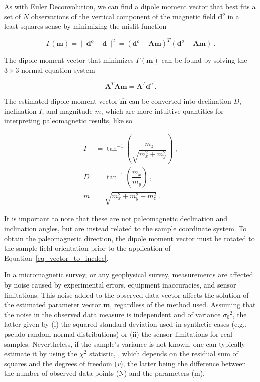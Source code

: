 As with Euler Deconvolution, we can find a dipole moment vector that best fits
a set of $N$ observations of the vertical component of the magnetic field
$\mathbf{d}^o$ in a least-squares sense by minimizing the misfit function

\begin{equation}
\label{uV9pRVYO4l}
\Gamma (\mathbf{m}) = \| \mathbf{d}^o - \mathbf{d} \|^2 = (\mathbf{d}^o - \mathbf{A}\mathbf{m})^T  (\mathbf{d}^o - \mathbf{A}\mathbf{m})\ .
\end{equation}

\noindent
The dipole moment vector that minimizes $\Gamma (\mathbf{m})$ can be found by
solving the $3 \times 3$ normal equation system

\begin{equation}
\mathbf{A}^T \mathbf{A} \mathbf{m} = \mathbf{A}^T\mathbf{d}^o\ .
\end{equation}

\noindent
The estimated dipole moment vector $\hat{\mathbf{m}}$ can be converted into declination $D$, inclination $I$, and magnitude $m$, which are more intuitive quantities for interpreting paleomagnetic results, like so

\begin{equation}
  \label{eq_vector_to_incdec}
\begin{aligned}
I &= \tan^{-1}\left(\dfrac{m_z}{\sqrt{m_x^2 + m_y^2}}\right) \ , \\
D &= \tan^{-1}\left(\dfrac{m_x}{m_y}\right) \ , \\
m &= \sqrt{m_x^2 + m_y^2 + m_z^2} \ .
\end{aligned}
\end{equation}

It is important to note that these are not paleomagnetic declination and inclination angles, but are instead related to the sample coordinate system. To obtain the paleomagnetic direction, the dipole moment vector must be rotated to the sample field orientation prior to the application of Equation~\ref{eq_vector_to_incdec}.

In a micromagnetic survey, or any geophysical survey, measurements are affected by noise caused by experimental errors, equipment inaccuracies, and sensor limitations. This noise added to the observed data vector affects the solution of the estimated parameter vector $\mathbf{m}$, regardless of the method used. Assuming that the noise in the observed data measure is independent and of variance ${\sigma_0}^2$, the latter given by (i) the squared standard deviation used in synthetic cases (e.g., pseudo-random normal distributions) or (ii) the sensor limitations for real samples. Nevertheless, if the sample's variance is not known, one can typically estimate it by using the \emph{$\chi^2$} statistic, \citep[Eq.~\ref{chi_square},][]{Aster2019}, which depends on the residual sum of squares and the degrees of freedom (\emph{v}), the latter being the difference between the number of observed data points (N) and the parameters (m).

